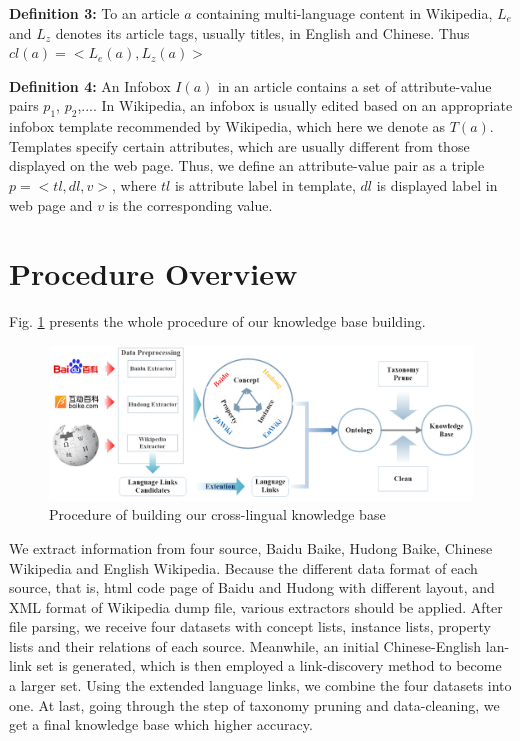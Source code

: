 \documentclass[runningheads,a4paper]{llncs}
\begin{document}
\textbf{Definition 3:} To an article $a$ containing multi-language content in Wikipedia, $L_{e}$ and $L_{z}$ denotes its article tags, usually titles, in English and Chinese. Thus $cl(a) = <L_{e}(a), L_{z}(a)>$

\textbf{Definition 4:} An Infobox $I(a)$ in an article contains a set of attribute-value pairs {$p_{1}$, $p_{2}$,...}. In Wikipedia, an infobox is usually edited based on an appropriate infobox template recommended by Wikipedia, which here we denote as $T(a)$. Templates specify certain attributes, which are usually different from those displayed on the web page. Thus, we define an attribute-value pair as a triple $p=<tl,dl,v>$, where $tl$ is attribute label in template, $dl$ is displayed label in web page and $v$ is the corresponding value.

\section{Procedure Overview}
Fig. \ref{fig:procedure} presents the whole procedure of our knowledge base building.
\begin{figure}[ht]
    \centerline{\includegraphics[width=1\columnwidth]{fig/procedure}}
    \label{fig:procedure}
    \caption{Procedure of building our cross-lingual knowledge base}
\end{figure}%
We extract information from four source, Baidu Baike, Hudong Baike, Chinese Wikipedia and English Wikipedia. Because the different data format of each source, that is, html code page of Baidu and Hudong with different layout, and XML format of Wikipedia dump file, various extractors should be applied. After file parsing, we receive four datasets with concept lists, instance lists, property lists and their relations of each source. Meanwhile, an initial Chinese-English lan-link set is generated, which is then employed a link-discovery method to become a larger set. Using the extended language links, we combine the four datasets into one. At last, going through the step of taxonomy pruning and data-cleaning, we get a final knowledge base which higher accuracy.
\end{document}
